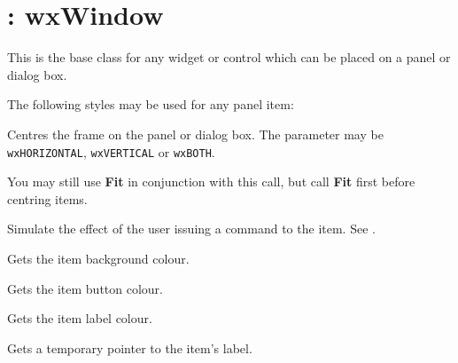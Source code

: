 \section{: wxWindow}\label{wxitem}

This is the base class for any widget or control which can be placed on a panel
or dialog box.

The following styles may be used for any panel item:

\begin{twocollist}\itemsep=0pt
\end{twocollist}



Centres the frame on the panel or dialog box. The parameter may be {\tt
wxHORIZONTAL}, {\tt wxVERTICAL} or {\tt wxBOTH}.

You may still use {\bf Fit} in conjunction with this call, but call {\bf Fit}\rtfsp
first before centring items.



Simulate the effect of the user issuing a command to the item. See .



Gets the item background colour.



Gets the item button colour.



Gets the item label colour.



Gets a temporary pointer to the item's label.

